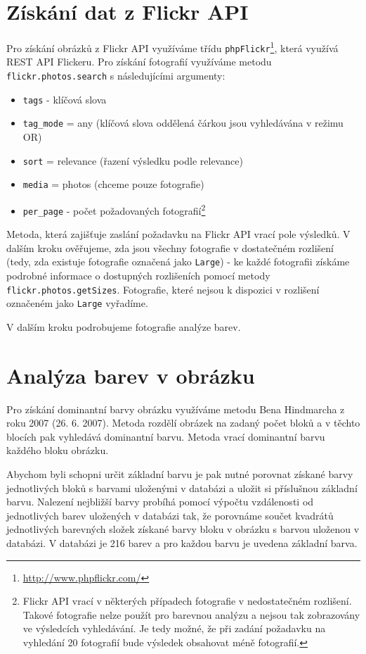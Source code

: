 \documentclass[12pt]{article}
\begin{document}
\section{Získání dat z Flickr API}
Pro získání obrázků z Flickr API využíváme třídu \texttt{phpFlickr}\footnote{\url{http://www.phpflickr.com/}}, která využívá REST API Flickeru. Pro získání fotografií využíváme metodu \texttt{flickr.photos.search} s následujícími argumenty:
\begin{itemize}
\item \texttt{tags} - klíčová slova
\item \texttt{tag\_mode} = any (klíčová slova oddělená čárkou jsou vyhledávána v režimu OR)
\item \texttt{sort} = relevance (řazení výsledku podle relevance)
\item \texttt{media} = photos (chceme pouze fotografie)
\item \texttt{per\_page} - počet požadovaných fotografií\footnote{Flickr API vrací v některých případech fotografie v nedostatečném rozlišení. Takové fotografie nelze použít pro barevnou analýzu a nejsou tak zobrazovány ve výsledcích vyhledávání. Je tedy možné, že při zadání požadavku na vyhledání 20 fotografií bude výsledek obsahovat méně fotografií.}
\end{itemize}

Metoda, která zajišťuje zaslání požadavku na Flickr API vrací pole výsledků. V dalším kroku ověřujeme, zda jsou všechny fotografie v dostatečném rozlišení (tedy, zda existuje fotografie označená jako \texttt{Large}) - ke každé fotografii získáme podrobné informace o dostupných rozlišeních pomocí metody \texttt{flickr.photos.getSizes}. Fotografie, které nejsou k dispozici v rozlišení označeném jako \texttt{Large} vyřadíme.

V dalším kroku podrobujeme fotografie analýze barev.

\section{Analýza barev v obrázku}
Pro získání dominantní barvy obrázku využíváme metodu Bena Hindmarcha z roku 2007 (26. 6. 2007). Metoda rozdělí obrázek na zadaný počet bloků a v těchto blocích pak vyhledává dominantní barvu. Metoda vrací dominantní barvu každého bloku obrázku.

Abychom byli schopni určit základní barvu je pak nutné porovnat získané barvy jednotlivých bloků s barvami uloženými v databázi a uložit si příslušnou základní barvu. Nalezení nejbližší barvy probíhá pomocí výpočtu vzdálenosti od jednotlivých barev uložených v databázi tak, že porovnáme součet kvadrátů jednotlivých barevných složek získané barvy bloku v obrázku s barvou uloženou v databázi. V databázi je 216 barev a pro každou barvu je uvedena základní barva.
\end{document}
